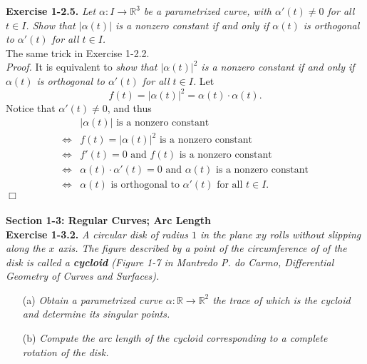 \documentclass{article}
\begin{document}
\textbf{Exercise 1-2.5.}
\emph{Let $\alpha: I \to \mathbb{R}^3$ be a parametrized curve,
with $\alpha'(t) \neq 0$ for all $t \in I$.
Show that $|\alpha(t)|$ is a nonzero constant
if and only if
$\alpha(t)$ is orthogonal to $\alpha'(t)$ for all $t \in I$.} \\

The same trick in Exercise 1-2.2. \\

\emph{Proof.}
It is equivalent to
\emph{show that $|\alpha(t)|^2$ is a nonzero constant
if and only if
$\alpha(t)$ is orthogonal to $\alpha'(t)$ for all $t \in I$.}
Let $$f(t) = |\alpha(t)|^2 = \alpha(t) \cdot \alpha(t).$$
Notice that $\alpha'(t) \neq 0$, and thus
\begin{align*}
&|\alpha(t)| \text{ is a nonzero constant} \\
\Longleftrightarrow&
f(t) = |\alpha(t)|^2 \text{ is a nonzero constant} \\
\Longleftrightarrow&
f'(t) = 0 \text{ and } f(t) \text{ is a nonzero constant} \\
\Longleftrightarrow&
\alpha(t) \cdot \alpha'(t) = 0 \text{ and } \alpha(t) \text{ is a nonzero constant} \\
\Longleftrightarrow&
\alpha(t) \text{ is orthogonal to } \alpha'(t) \text{ for all } t \in I.
\end{align*}
$\Box$ \\\\









\textbf{\large Section 1-3: Regular Curves; Arc Length} \\



\textbf{Exercise 1-3.2.}
\emph{A circular disk of radius $1$ in the plane $xy$ rolls without slipping
along the $x$ axis.
The figure described by a point of the circumference of of the disk is
called a \textbf{cycloid}
(Figure 1-7 in Mantredo P. do Carmo, Differential Geometry of Curves and Surfaces).}
\begin{enumerate}
  \item[(a)]
  \emph{Obtain a parametrized curve $\alpha: \mathbb{R} \to \mathbb{R}^2$
  the trace of which is the cycloid and determine its singular points.}
  \item[(b)]
  \emph{Compute the arc length of the cycloid
  corresponding to a complete rotation of the disk.} \\
\end{enumerate}
\end{document}

